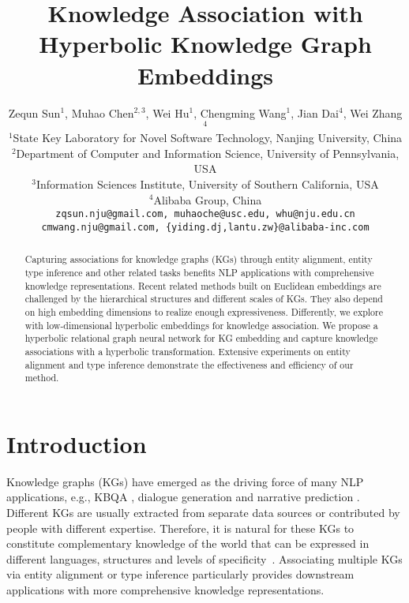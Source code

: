 \documentclass[11pt,a4paper]{article}
\title{Knowledge Association with Hyperbolic Knowledge Graph Embeddings}
\author{Zequn Sun$^1$, 
 		Muhao Chen$^{2,3}$, 
 		Wei Hu$^1$, 
 		Chengming Wang$^1$, 
 		Jian Dai$^4$, 
 		Wei Zhang$^4$\\
  $^1$State Key Laboratory for Novel Software Technology, Nanjing University, China \\
  $^2$Department of Computer and Information Science, University of Pennsylvania, USA \\
  $^3$Information Sciences Institute, University of Southern California, USA \\
  $^4$Alibaba Group, China \\
  \normalsize\texttt{zqsun.nju@gmail.com,\,muhaoche@usc.edu,\,whu@nju.edu.cn} \\
  \normalsize\texttt{cmwang.nju@gmail.com,\,\{yiding.dj,lantu.zw\}@alibaba-inc.com}}
\date{}
\begin{document}
\maketitle

\begin{abstract}
Capturing associations for knowledge graphs (KGs) through entity alignment, entity type inference and other related tasks benefits NLP applications with comprehensive knowledge representations. Recent related methods built on Euclidean embeddings are challenged by the hierarchical structures and different scales of KGs. They also depend on high embedding dimensions to realize enough expressiveness. Differently, we explore with low-dimensional hyperbolic embeddings for knowledge association. We propose a hyperbolic relational graph neural network for KG embedding and capture knowledge associations with a hyperbolic transformation. Extensive experiments on entity alignment and type inference demonstrate the effectiveness and efficiency of our method.
\end{abstract}

\section{Introduction}
Knowledge graphs (KGs) have emerged as the driving force of many NLP applications, e.g., KBQA \cite{HixonCH15}, dialogue generation \cite{OpenDialKG} and narrative prediction \cite{chen2019incorporating}. Different KGs are usually extracted from separate data sources or contributed by people with different expertise. Therefore, it is natural for these KGs to constitute complementary knowledge of the world that can be expressed in different languages, structures and levels of specificity~\cite{lehmann2015dbpedia,speer2017conceptnet}. Associating multiple KGs via entity alignment \cite{MTransE} or type inference \cite{JOIE} particularly provides downstream applications with more comprehensive knowledge representations. 
\end{document}
